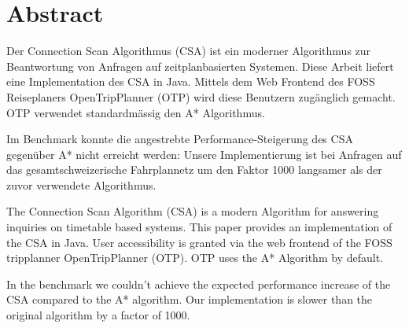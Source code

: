 \section{Abstract}
Der Connection Scan Algorithmus (CSA) ist ein moderner  Algorithmus zur Beantwortung von Anfragen auf zeitplanbasierten Systemen. Diese Arbeit liefert eine Implementation des CSA in Java. Mittels dem Web Frontend des FOSS Reiseplaners OpenTripPlanner (OTP) wird diese Benutzern zugänglich gemacht. OTP verwendet standardmässig den A* Algorithmus. 

Im Benchmark konnte die angestrebte Performance-Steigerung des CSA gegenüber A* nicht erreicht werden: Unsere Implementierung ist bei Anfragen auf das gesamtschweizerische Fahrplannetz um den Faktor 1000 langsamer als der zuvor verwendete Algorithmus.

\newpage 

The Connection Scan Algorithm (CSA) is a modern Algorithm for answering inquiries on timetable based systems. This paper provides an implementation of the CSA in Java. User accessibility is granted via the web frontend of the FOSS tripplanner OpenTripPlanner (OTP). OTP uses the A* Algorithm by default.

In the benchmark we couldn’t achieve the expected performance increase of the CSA compared to the A* algorithm. Our implementation is slower than the original algorithm by a factor of 1000.




